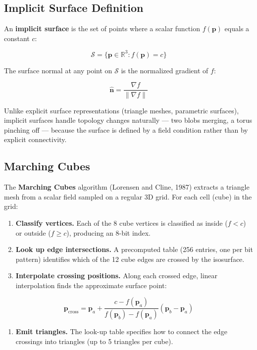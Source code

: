\documentclass[
  11pt,
  letterpaper,
  DIV=11,
  numbers=noendperiod,
  twoside,
  open=right]{scrreprt}
\providecommand{\tightlist}{%
  \setlength{\itemsep}{0pt}\setlength{\parskip}{0pt}}
\begin{document}
\subsection{Implicit Surface
Definition}\label{implicit-surface-definition}

An \textbf{implicit surface} is the set of points where a scalar
function \(f(\mathbf{p})\) equals a constant \(c\):

\[
\mathcal{S} = \{ \mathbf{p} \in \mathbb{R}^3 : f(\mathbf{p}) = c \}
\]

The surface normal at any point on \(\mathcal{S}\) is the normalized
gradient of \(f\):

\[
\hat{\mathbf{n}} = \frac{\nabla f}{\|\nabla f\|}
\]

Unlike explicit surface representations (triangle meshes, parametric
surfaces), implicit surfaces handle topology changes naturally --- two
blobs merging, a torus pinching off --- because the surface is defined
by a field condition rather than by explicit connectivity.

\subsection{Marching Cubes}\label{marching-cubes}

The \textbf{Marching Cubes} algorithm (Lorensen and Cline, 1987)
extracts a triangle mesh from a scalar field sampled on a regular 3D
grid. For each cell (cube) in the grid:

\begin{enumerate}
\def\labelenumi{\arabic{enumi}.}
\tightlist
\item
  \textbf{Classify vertices.} Each of the 8 cube vertices is classified
  as inside (\(f < c\)) or outside (\(f \geq c\)), producing an 8-bit
  index.
\item
  \textbf{Look up edge intersections.} A precomputed table (256 entries,
  one per bit pattern) identifies which of the 12 cube edges are crossed
  by the isosurface.
\item
  \textbf{Interpolate crossing positions.} Along each crossed edge,
  linear interpolation finds the approximate surface point:
\end{enumerate}

\[
\mathbf{p}_{\text{cross}} = \mathbf{p}_a + \frac{c - f(\mathbf{p}_a)}{f(\mathbf{p}_b) - f(\mathbf{p}_a)} (\mathbf{p}_b - \mathbf{p}_a)
\]

\begin{enumerate}
\def\labelenumi{\arabic{enumi}.}
\setcounter{enumi}{3}
\tightlist
\item
  \textbf{Emit triangles.} The look-up table specifies how to connect
  the edge crossings into triangles (up to 5 triangles per cube).
\end{enumerate}
\end{document}
